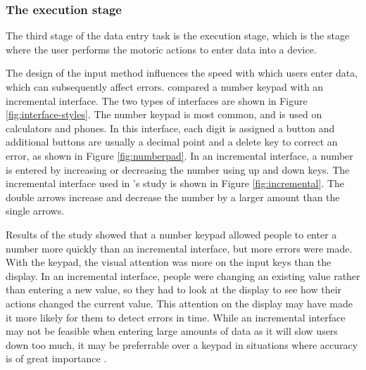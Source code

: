 
\subsubsection{The execution stage}
The third stage of the data entry task is the execution stage, which is the stage where the user performs the motoric actions to enter data into a device.

The design of the input method influences the speed with which users enter data, which can subsequently affect errors. \citet{Oladimeji2011} compared a number keypad with an incremental interface. The two types of interfaces are shown in Figure \ref{fig:interface-styles}. The number keypad is most common, and is used on calculators and phones. In this interface, each digit is assigned a button and additional buttons are usually a decimal point and a delete key to correct an error, as shown in Figure \ref{fig:numberpad}. In an incremental interface, a number is entered by increasing or decreasing the number using up and down keys. The incremental interface used in \citeauthor{Oladimeji2011}'s study is shown in Figure \ref{fig:incremental}. The double arrows increase and decrease the number by a larger amount than the single arrows. 

Results of the study showed that a number keypad allowed people to enter a number more quickly than an incremental interface, but more errors were made. With the keypad, the visual attention was more on the input keys than the display. In an incremental interface, people were changing an existing value rather than entering a new value, so they had to look at the display to see how their actions changed the current value. This attention on the display may have made it more likely for them to detect errors in time. While an incremental interface may not be feasible when entering large amounts of data as it will slow users down too much, it may be preferrable over a keypad in situations where accuracy is of great importance \citep{Thimbleby2011}. 

